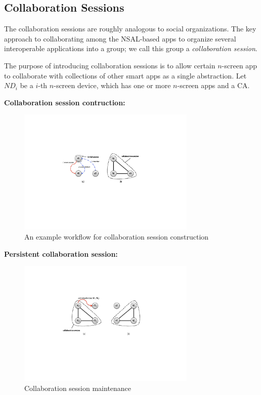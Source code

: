 \documentclass{sig-alternate}
\begin{document}
\subsection{Collaboration Sessions}
The collaboration sessions are roughly analogous to social organizations.
The key approach to collaborating among the NSAL-based apps to organize several interoperable applications into a group; we call this group a \textit{collaboration session}.

The purpose of introducing collaboration sessions is to allow certain $n$-screen app to collaborate with collections of other smart apps as a single abstraction. Let $ND_i$ be a $i$-th $n$-screen device, which has one or more $n$-screen apps and a CA.

\noindent
\textbf{Collaboration session contruction:}  

    \begin{figure}[htb] %
    \centering
    \includegraphics[width=8.5cm,keepaspectratio]{constructsession}
    \caption{An example workflow for collaboration session construction}
    \label{fig:constructsession}
    \end{figure}

\noindent
\textbf{Persistent collaboration session:}  
%
    \begin{figure}[htb] %
    \centering
    \includegraphics[width=8.5cm,keepaspectratio]{pushmigration}
    \caption{Collaboration session maintenance}
    \label{fig:pushmigration}
    \end{figure}
%
%
\end{document}
